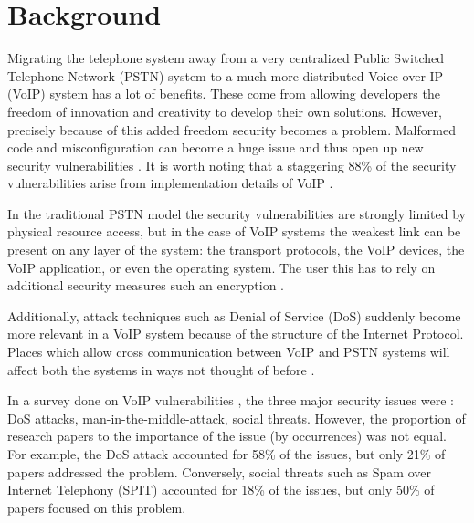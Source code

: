 \section{Background}


Migrating the telephone system away from a very centralized Public Switched Telephone Network (PSTN) system to a much more distributed Voice over IP (VoIP) system has a lot of benefits. These come from allowing developers the freedom of innovation and creativity to develop their own solutions. However, precisely because of this added freedom security becomes a problem. Malformed code and misconfiguration can become a huge issue and thus open up new security vulnerabilities \cite{voipbg}. It is worth noting that a staggering 88\% of the security vulnerabilities arise from implementation details of VoIP \cite{keromytis}.

In the traditional PSTN model the security vulnerabilities are strongly limited by physical resource access, but in the case of VoIP systems the weakest link can be present on any layer of the system: the transport protocols, the VoIP devices, the VoIP application, or even the operating system. The user this has to rely on additional security measures such an encryption \cite{voipbg}. 

Additionally, attack techniques such as Denial of Service (DoS) suddenly become more relevant in a VoIP system because of the structure of the Internet Protocol. Places which allow cross communication between VoIP and PSTN systems will affect both the systems in ways not thought of before \cite{voipbg}.

In a survey done on VoIP vulnerabilities \cite{keromytis}, the three major security issues were : DoS attacks, man-in-the-middle-attack, social threats. However, the proportion of research papers to the importance of the issue (by occurrences) was not equal. For example, the DoS attack accounted for 58\% of the issues, but only 21\% of papers addressed the problem. Conversely, social threats such as Spam over Internet Telephony (SPIT) accounted for 18\% of the issues, but only 50\% of papers focused on this problem. 

